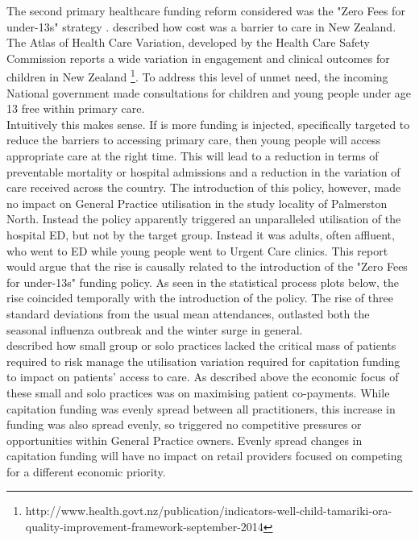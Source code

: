\documentclass[11pt,a4paper]{article}
\begin{document}
The second primary healthcare funding reform considered was the "Zero Fees for under-13s" strategy \citep{frizelle2014health}. \citet{schoen2009survey} described how cost was a barrier to care in New Zealand. The Atlas of Health Care Variation, developed by the Health Care Safety Commission reports a wide variation in engagement and clinical outcomes for children in New Zealand \footnote{http://www.health.govt.nz/publication/indicators-well-child-tamariki-ora-quality-improvement-framework-september-2014}. To address this level of unmet need, the incoming National government made consultations for children and young people under age 13 free within primary care\citep{frizelle2014health}. \\


Intuitively this makes sense. If is more funding is injected, specifically targeted to reduce the barriers to accessing primary care, then young people will access appropriate care at the right time. This will lead to a reduction in terms of preventable mortality or hospital admissions and a reduction in the variation of care received across the country. The introduction of this policy, however, made no impact on General Practice utilisation in the study locality of Palmerston North. Instead the policy apparently triggered an unparalleled utilisation of the hospital ED, but not by the target group. Instead it was adults, often affluent, who went to ED while young people went to Urgent Care clinics. This report would argue that the rise is causally related to the introduction of the "Zero Fees for under-13s" funding policy. As seen in the statistical process plots below, the rise coincided temporally with the introduction of the policy. The rise of three standard deviations from the usual mean attendances, outlasted both the seasonal influenza outbreak and the winter surge in general.\\


\citet{howell2005restructuring} described how small group or solo practices lacked the critical mass of patients required to risk manage the utilisation variation required for capitation funding to impact on patients’ access to care. As described above the economic focus of these small and solo practices was on maximising patient co-payments. While capitation funding was evenly spread between all practitioners, this increase in funding was also spread evenly, so triggered no competitive pressures or opportunities within General Practice owners. Evenly spread changes in capitation funding will have no impact on retail providers focused on competing for a different economic priority.\\
\end{document}
